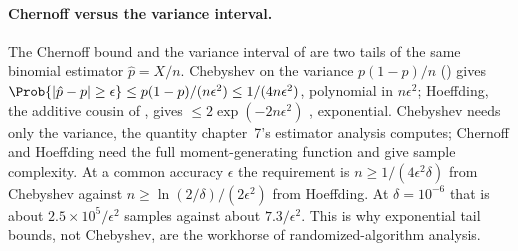 \paragraph{Chernoff versus the variance interval.}
The Chernoff bound and the variance interval of 
are two tails of the same binomial estimator $\hat p = X/n$. Chebyshev on the
variance $p(1-p)/n$ () gives $\Prob{|\hat p - p| \ge
\epsilon} \le p(1-p)/(n\epsilon^2) \le 1/(4n\epsilon^2)$, polynomial in
$n\epsilon^2$; Hoeffding, the additive cousin of , gives
$\le 2\exp(-2n\epsilon^2)$ \parencite{hoeffding-1963}, exponential. Chebyshev
needs only the variance, the quantity chapter~7's estimator analysis computes;
Chernoff and Hoeffding need the full moment-generating function and give sample
complexity. At a common accuracy $\epsilon$ the requirement is $n \ge
1/(4\epsilon^2\delta)$ from Chebyshev against $n \ge \ln(2/\delta)/(2\epsilon^2)$
from Hoeffding. At $\delta = 10^{-6}$ that is about $2.5 \times
10^5/\epsilon^2$ samples against about $7.3/\epsilon^2$. This is why exponential
tail bounds, not Chebyshev, are the workhorse of randomized-algorithm
analysis.
